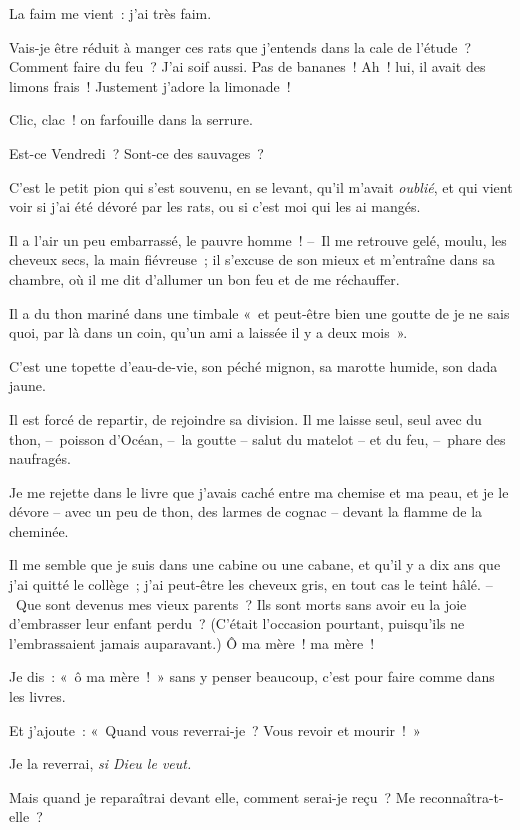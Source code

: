 \documentclass[french,twoside]{book} %
\begin{document}
La faim me vient : j’ai très faim.\par
Vais-je être réduit à manger ces rats que j’entends dans la cale de l’étude ? Comment faire du feu ? J’ai soif aussi. Pas de bananes ! Ah ! lui, il avait des limons frais ! Justement j’adore la limonade !\par
\bigbreak
\noindent Clic, clac ! on farfouille dans la serrure.\par
\bigbreak
\noindent Est-ce Vendredi ? Sont-ce des sauvages ?\par
C’est le petit pion qui s’est souvenu, en se levant, qu’il m’avait \emph{oublié}, et qui vient voir si j’ai été dévoré par les rats, ou si c’est moi qui les ai mangés.\par
Il a l’air un peu embarrassé, le pauvre homme ! – Il me retrouve gelé, moulu, les cheveux secs, la main fiévreuse ; il s’excuse de son mieux et m’entraîne dans sa chambre, où il me dit d’allumer un bon feu et de me réchauffer.\par
Il a du thon mariné dans une timbale « et peut-être bien une goutte de je ne sais quoi, par là dans un coin, qu’un ami a laissée il y a deux mois ».\par
C’est une topette d’eau-de-vie, son péché mignon, sa marotte humide, son dada jaune.\par
Il est forcé de repartir, de rejoindre sa division. Il me laisse seul, seul avec du thon, – poisson d’Océan, – la goutte – salut du matelot – et du feu, – phare des naufragés.\par
Je me rejette dans le livre que j’avais caché entre ma chemise et ma peau, et je le dévore – avec un peu de thon, des larmes de cognac – devant la flamme de la cheminée.\par
Il me semble que je suis dans une cabine ou une cabane, et qu’il y a dix ans que j’ai quitté le collège ; j’ai peut-être les cheveux gris, en tout cas le teint hâlé. – Que sont devenus mes vieux parents ? Ils sont morts sans avoir eu la joie d’embrasser leur enfant perdu ? (C’était l’occasion pourtant, puisqu’ils ne l’embrassaient jamais auparavant.) Ô ma mère ! ma mère !\par
Je dis : « ô ma mère ! » sans y penser beaucoup, c’est pour faire comme dans les livres.\par
Et j’ajoute : « Quand vous reverrai-je ? Vous revoir et mourir ! »\par
Je la reverrai, \emph{si Dieu le veut.}\par
Mais quand je reparaîtrai devant elle, comment serai-je reçu ? Me reconnaîtra-t-elle ?\par
\end{document}
